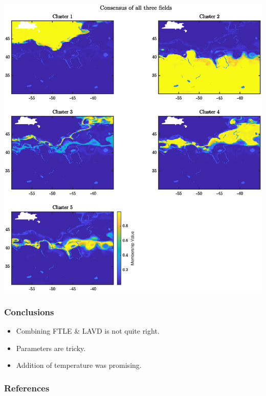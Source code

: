 \documentclass[english,svgnames,notes=hide,14pt]{beamer}
\newcommand{\sectslide}[1]{
\section{#1}
\begin{frame}
	\centering\Large
	\thesection.\, #1
\end{frame}
}
\begin{document}
\begin{frame}
	\centering
	\includegraphics[height = 0.89\textheight]{../figures/atlantic_member_sensible}
\end{frame}


\begin{frame}
	\frametitle{Conclusions}
	\begin{itemize}	
	\item Combining FTLE \& LAVD is not quite right.
	\item Parameters are tricky.
	\item Addition of temperature was promising.
	\end{itemize}
\end{frame}



\begin{frame}
	\frametitle{References}
	\footnotesize


\end{frame}
\end{document}
